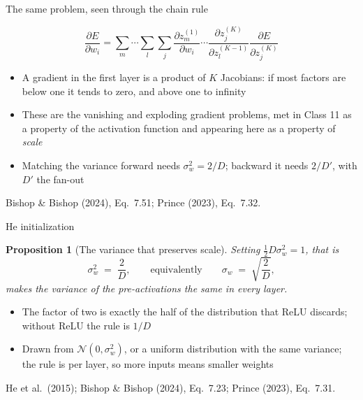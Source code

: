 \documentclass[aspectratio=169, 11pt]{beamer}
\newtheorem{propx}[theorem]{Proposition}
\newcommand{\srcline}[1]{%
  \par\vspace{0.25em}%
  {\scriptsize\color{mcMuted}\hfill #1\par}}
\newcommand{\src}[3]{}      %
\begin{document}
\begin{frame}{The same problem, seen through the chain rule}
  \src{bishop2024}{equation}{7.51}
  \src{bishop2024}{section}{7.4.2}
  \src{prince2023}{equation}{7.32}
  \src{prince2023}{section}{7.5.2}
  \vspace{-0.35em}
  \[
    \frac{\partial E}{\partial w_i}
      = \sum_m \cdots \sum_l \sum_j
        \frac{\partial z^{(1)}_m}{\partial w_i} \cdots
        \frac{\partial z^{(K)}_j}{\partial z^{(K-1)}_l}
        \frac{\partial E}{\partial z^{(K)}_j}
  \]
  \vspace{-0.7em}
  \begin{itemize}\itemsep0.3em
    \item A gradient in the first layer is a product of $K$ Jacobians:
          if most factors are below one it tends to zero, and above one
          to infinity
    \item These are the \alert{vanishing} and \alert{exploding} gradient
          problems, met in Class 11 as a property of the activation
          function and appearing here as a property of \emph{scale}
    \item Matching the variance forward needs $\sigma_w^2 = 2/D$;
          backward it needs $2/D'$, with $D'$ the fan-out
  \end{itemize}
  \srcline{Bishop \& Bishop (2024), Eq.~7.51; Prince (2023), Eq.~7.32.}
\end{frame}

\begin{frame}{He initialization}
  \src{he2015}{equation}{10}
  \src{he2015}{section}{2.2}
  \src{bishop2024}{equation}{7.23}
  \src{bishop2024}{section}{7.2.5}
  \src{prince2023}{equation}{7.31}
  \src{prince2023}{section}{7.5.1}
  \vspace{-0.3em}
  \begin{propx}[The variance that preserves scale]\label{th:he}
    \small
    Setting $\tfrac12 D \sigma_w^2 = 1$, that is
    \[
      \sigma_w^2 \;=\; \frac{2}{D},
      \qquad\text{equivalently}\qquad
      \sigma_w \;=\; \sqrt{\frac{2}{D}} ,
    \]
    makes the variance of the pre-activations the same in every layer.
  \end{propx}
  \vspace{0.25em}
  \begin{itemize}\itemsep0.3em
    \item The factor of two is exactly the half of the distribution that
          ReLU discards; without ReLU the rule is $1/D$
    \item Drawn from $\mathcal{N}(0, \sigma_w^2)$, or a uniform
          distribution with the same variance; the rule is per layer, so
          more inputs means smaller weights
  \end{itemize}
  \srcline{He et al.~(2015); Bishop \& Bishop (2024), Eq.~7.23;
  Prince (2023), Eq.~7.31.}
\end{frame}
\end{document}
